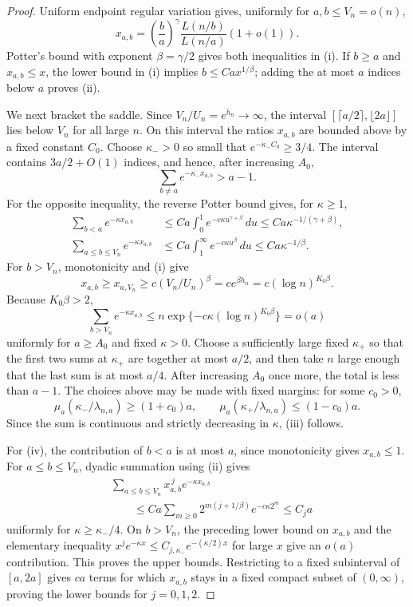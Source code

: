 \documentclass[11pt]{article}
\theoremstyle{remark}
\newcommand{\dd}{\,d}
\begin{document}
\begin{proof}
Uniform endpoint regular variation gives, uniformly for $a,b\le V_n=o(n)$,
\[
        x_{a,b}
        =\left(\frac ba\right)^\gamma
        \frac{L(n/b)}{L(n/a)}(1+o(1)).
\]
Potter's bound with exponent $\beta=\gamma/2$ gives both inequalities in
(i).  If $b\ge a$ and $x_{a,b}\le x$, the lower bound in (i) implies
$b\le Ca x^{1/\beta}$; adding the at most $a$ indices below $a$ proves (ii).

We next bracket the saddle.  Since $V_n/U_n=e^{h_n}\to\infty$, the interval
$[\lceil a/2\rceil,\lfloor2a\rfloor]$ lies below $V_n$ for all large $n$.
On this interval the ratios $x_{a,b}$ are bounded above by a fixed constant
$C_0$.  Choose $\kappa_->0$ so small that
$e^{-\kappa_-C_0}\ge3/4$.  The interval contains
$3a/2+O(1)$ indices, and hence, after increasing $A_0$,
\[
        \sum_{b\ne a}e^{-\kappa_-x_{a,b}}>a-1.
\]
For the opposite inequality, the reverse Potter bound gives, for $\kappa\ge1$,
\[
\begin{aligned}
        \sum_{b<a}e^{-\kappa x_{a,b}}
        &\le C a\int_0^1e^{-c\kappa u^{\gamma+\beta}}\dd u
        \le Ca\kappa^{-1/(\gamma+\beta)},\\
        \sum_{a\le b\le V_n}e^{-\kappa x_{a,b}}
        &\le C a\int_1^\infty e^{-c\kappa u^\beta}\dd u
        \le Ca\kappa^{-1/\beta}.
\end{aligned}
\]
For $b>V_n$, monotonicity and (i) give
\[
        x_{a,b}\ge x_{a,V_n}
        \ge c(V_n/U_n)^\beta
        =c e^{\beta h_n}
        =c(\log n)^{K_0\beta}.
\]
Because $K_0\beta>2$,
\[
        \sum_{b>V_n}e^{-\kappa x_{a,b}}
        \le n\exp\{-c\kappa(\log n)^{K_0\beta}\}=o(a)
\]
uniformly for $a\ge A_0$ and fixed $\kappa>0$.  Choose a sufficiently large
fixed $\kappa_+$ so that the first two sums at $\kappa_+$ are together at most
$a/2$, and then take $n$ large enough that the last sum is at most $a/4$.
After increasing $A_0$ once more, the total is less than $a-1$.  The
choices above may be made with fixed margins: for some $c_0>0$,
\[
        \mu_a(\kappa_-/\lambda_{n,a})\ge(1+c_0)a,
        \qquad
        \mu_a(\kappa_+/\lambda_{n,a})\le(1-c_0)a.
\]
Since the sum is continuous and strictly decreasing in $\kappa$, (iii)
follows.

For (iv), the contribution of $b<a$ is at most $a$, since monotonicity gives
$x_{a,b}\le1$.  For $a\le b\le V_n$, dyadic summation using (ii) gives
\[
\begin{aligned}
&\sum_{a\le b\le V_n}x_{a,b}^{\,j}e^{-\kappa x_{a,b}}\\
&\qquad\le Ca\sum_{m\ge0}
        2^{m(j+1/\beta)}e^{-c\kappa2^m}
        \le C_ja
\end{aligned}
\]
uniformly for $\kappa\ge\kappa_-/4$.  On $b>V_n$, the preceding lower bound
on $x_{a,b}$ and the elementary inequality
$x^je^{-\kappa x}\le C_{j,\kappa_-}e^{-(\kappa/2)x}$ for large $x$ give an
$o(a)$ contribution.  This proves the upper bounds.  Restricting to a fixed
subinterval of $[a,2a]$ gives $ca$ terms for which $x_{a,b}$ stays in a fixed
compact subset of $(0,\infty)$, proving the lower bounds for $j=0,1,2$.


\end{proof}
\end{document}
